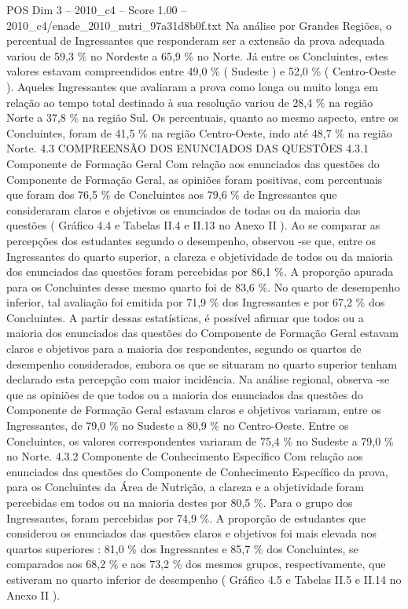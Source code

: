 \begin{textsample}{POS Dim 3 – 2010\_c4 – Score 1.00 – 2010\_c4/enade\_2010\_nutri\_97a31d8b0f.txt}
Na análise por Grandes Regiões, o percentual de Ingressantes que responderam ser a extensão da prova adequada variou de 59,3 \% no Nordeste a 65,9 \% no Norte.
Já entre os Concluintes, estes valores estavam compreendidos entre 49,0 \% ( Sudeste ) e 52,0 \% ( Centro-Oeste ).
Aqueles Ingressantes que avaliaram a prova como longa ou muito longa em relação ao tempo total destinado à sua resolução variou de 28,4 \% na região Norte a 37,8 \% na região Sul.
Os percentuais, quanto ao mesmo aspecto, entre os Concluintes, foram de 41,5 \% na região Centro-Oeste, indo até 48,7 \% na região Norte. 4.3 COMPREENSÃO DOS ENUNCIADOS DAS QUESTÕES 4.3.1 Componente de Formação Geral Com relação aos enunciados das questões do Componente de Formação Geral, as opiniões foram positivas, com percentuais que foram dos 76,5 \% de Concluintes aos 79,6 \% de Ingressantes que consideraram claros e objetivos os enunciados de todas ou da maioria das questões ( Gráfico 4.4 e Tabelas II.4 e II.13 no Anexo II ).
Ao se comparar as percepções dos estudantes segundo o desempenho, observou -se que, entre os Ingressantes do quarto superior, a clareza e objetividade de todos ou da maioria dos enunciados das questões foram percebidas por 86,1 \%.
A proporção apurada para os Concluintes desse mesmo quarto foi de 83,6 \%.
No quarto de desempenho inferior, tal avaliação foi emitida por 71,9 \% dos Ingressantes e por 67,2 \% dos Concluintes.
A partir dessas estatísticas, é possível afirmar que todos ou a maioria dos enunciados das questões do Componente de Formação Geral estavam claros e objetivos para a maioria dos respondentes, segundo os quartos de desempenho considerados, embora os que se situaram no quarto superior tenham declarado esta percepção com maior incidência.
Na análise regional, observa -se que as opiniões de que todos ou a maioria dos enunciados das questões do Componente de Formação Geral estavam claros e objetivos variaram, entre os Ingressantes, de 79,0 \% no Sudeste a 80,9 \% no Centro-Oeste.
Entre os Concluintes, os valores correspondentes variaram de 75,4 \% no Sudeste a 79,0 \% no Norte. 4.3.2 Componente de Conhecimento Específico Com relação aos enunciados das questões do Componente de Conhecimento Específico da prova, para os Concluintes da Área de Nutrição, a clareza e a objetividade foram percebidas em todos ou na maioria destes por 80,5 \%.
Para o grupo dos Ingressantes, foram percebidas por 74,9 \%.
A proporção de estudantes que considerou os enunciados das questões claros e objetivos foi mais elevada nos quartos superiores : 81,0 \% dos Ingressantes e 85,7 \% dos Concluintes, se comparados aos 68,2 \% e aos 73,2 \% dos mesmos grupos, respectivamente, que estiveram no quarto inferior de desempenho ( Gráfico 4.5 e Tabelas II.5 e II.14 no Anexo II ).

\end{textsample}
